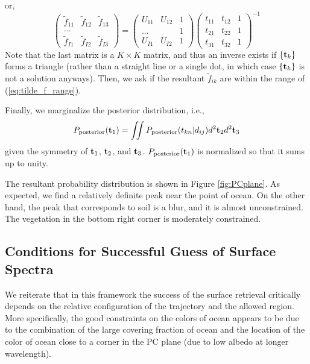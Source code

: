 \documentclass[iop,numberedappendix,apj,]{emulateapj}
\def\fast{\tilde f}
\begin{document}
or,
\begin{equation}
\begin{pmatrix}
\fast_{11} & \fast_{12} & \fast_{13}  \\
... & \\
\fast_{I1} & \fast_{I2} & \fast_{I3}
\end{pmatrix}
=
\begin{pmatrix}
U_{11} & U_{12} & 1 \\
... & & 1 \\
U_{I1} & U_{I2} & 1 
\end{pmatrix}
\begin{pmatrix}
t_{11} & t_{12} & 1 \\
t_{21} & t_{22} & 1 \\
t_{31} & t_{32} & 1 
\end{pmatrix}^{-1}
\label{eq:f=ds-1}
\end{equation}
Note that the last matrix is a $K\times K$ matrix, and thus an inverse exists if $\{ {\bf t}_k \}$ forms a triangle (rather than a straight line or a single dot, in which case $\{ {\bf t}_k \}$ is not a solution anyways).
Then, we ask if the resultant $\fast_{ik}$ are within the range of (\ref{eq:tilde_f_range}). 

Finally, we marginalize the posterior distribution, i.e.,
\begin{equation} 
P_{\rm posterior} ( {\bf t}_1) = \iint P_{\rm posterior} ( t_{kn} | d_{ij} ) d^2 {\bf t}_2 d^2 {\bf t}_3
\end{equation}
given the symmetry of ${\bf t}_1$, ${\bf t}_2$, and ${\bf t}_3$. 
$P_{\rm posterior} ( {\bf t}_1) $ is normalized so that it sums up to unity. 

The resultant probability distribution is shown in Figure \ref{fig:PCplane}. 
As expected, we find a relatively definite peak near the point of ocean. 
On the other hand, the peak that corresponds to soil is a blur, and it is almost unconstrained. 
The vegetation in the bottom right corner is moderately constrained. 


\subsection{Conditions for Successful Guess of Surface Spectra}
\label{ss:guess}


We reiterate that in this framework the success of the surface retrieval critically depends on the relative configuration of the trajectory and the allowed region. 
More specifically, the good constraints on the colors of ocean appears to be due to the combination of the large covering fraction of ocean and the location of the color of ocean close to a corner in the PC plane (due to low albedo at longer wavelength). 
\end{document}
